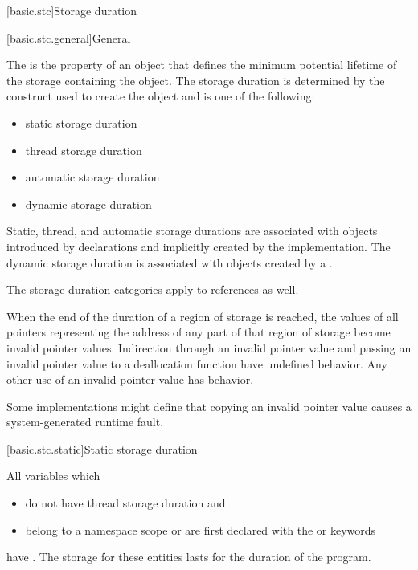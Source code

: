 [basic.stc]{Storage duration}

[basic.stc.general]{General}

\pnum
{}%
The  is the property of an object that defines the minimum
potential lifetime of the storage containing the object. The storage
duration is determined by the construct used to create the object and is
one of the following:
\begin{itemize}
\item static storage duration
\item thread storage duration
\item automatic storage duration
\item dynamic storage duration
\end{itemize}

\pnum
{}%
%
%
%
Static, thread, and automatic storage durations are associated with objects
introduced by declarations and implicitly created by
the implementation. The dynamic storage duration
is associated with objects created by a
.

\pnum
The storage duration categories apply to references as well.

\pnum
When the end of the duration of a region of storage is reached,
the values of all pointers
representing the address of any part of that region of storage
become invalid pointer values.
Indirection through an invalid pointer value and
passing an invalid pointer value to a deallocation function
have undefined behavior.
Any other use of an invalid pointer value has
behavior.
\begin{footnote}
Some implementations might define that
copying an invalid pointer value
causes a system-generated runtime fault.
\end{footnote}

[basic.stc.static]{Static storage duration}

\pnum
{}%
All variables which
\begin{itemize}
\item
do not have thread storage duration and
\item
belong to a namespace scope or
are first declared with
the  or  keywords
\end{itemize}
have .
The storage for these entities lasts for the duration of the
program.

